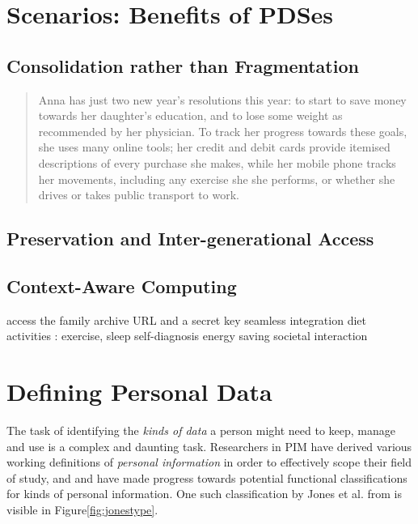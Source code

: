 \documentclass[runningheads,a4paper]{llncs}
\begin{document}
\section{Scenarios: Benefits of PDSes}

\subsection{Consolidation rather than Fragmentation}

\begin{quote}
Anna has just two new year's resolutions this year: to start to save money towards her daughter's education, and to lose some weight as recommended by her physician.  To track her progress towards these goals, she uses many online tools; her credit and debit cards provide itemised descriptions of every purchase she makes, while her mobile phone tracks her movements, including any exercise she she performs, or whether she drives or takes public transport to work.

\end{quote}

\subsection{Preservation and Inter-generational Access}
\subsection{Context-Aware Computing}

access the family archive
URL and a secret key
seamless integration
  diet
  activities : exercise, sleep
  self-diagnosis
  energy saving
societal interaction

\section{Defining Personal Data}

The task of identifying the \emph{kinds of data} a person might need to keep, manage and use is a complex and daunting task.  Researchers in PIM have derived various working definitions of \emph{personal information} in order to effectively scope their field of study, and and have made progress towards potential functional classifications for kinds of personal information. One such classification by Jones et al. from \cite{kftf} is visible in Figure\ref{fig:jonestype}.
\end{document}
